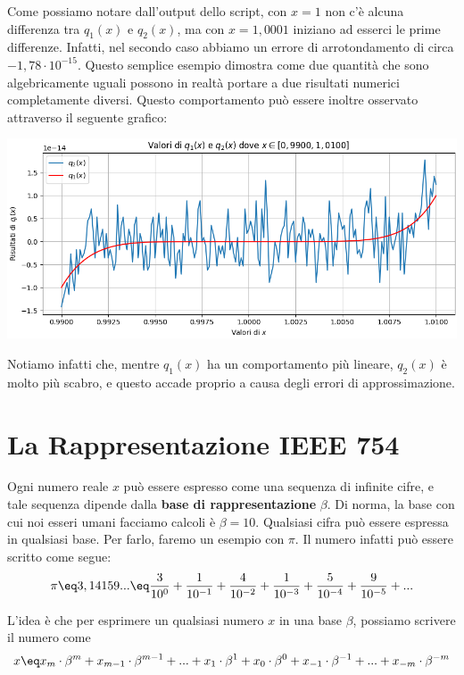 \begin{example}
    Come possiamo notare dall'output dello script, con $x = 1$ non c'è alcuna differenza tra $q_1(x)$ e $q_2(x)$, ma con $x = 1,0001$ iniziano ad esserci le prime differenze. Infatti, nel secondo caso abbiamo un errore di arrotondamento di circa $-1,78 \cdot 10^{-15}$. Questo semplice esempio dimostra come due quantità che sono algebricamente uguali possono in realtà portare a due risultati numerici completamente diversi.
    \nl
    Questo comportamento può essere inoltre osservato attraverso il seguente grafico:
    \begin{center}
        \includegraphics[width = \linewidth]{assets/image-001.png}
    \end{center}

    Notiamo infatti che, mentre $q_1(x)$ ha un comportamento più lineare, $q_2(x)$ è molto più scabro, e questo accade proprio a causa degli errori di approssimazione.
\end{example}

\section{La Rappresentazione IEEE 754}

Ogni numero reale $x$ può essere espresso come una sequenza di infinite cifre, e tale sequenza dipende dalla \textbf{base di rappresentazione} $\beta$. Di norma, la base con cui noi esseri umani facciamo calcoli è $\beta = 10$.
\nl
Qualsiasi cifra può essere espressa in qualsiasi base. Per farlo, faremo un esempio con $\pi$. Il numero infatti può essere scritto come segue:
\[ \pi \eq 3,14159... \eq \frac{3}{10^0} + \frac{1}{10^{-1}} + \frac{4}{10^{-2}} + \frac{1}{10^{-3}} + \frac{5}{10^{-4}} + \frac{9}{10^{-5}} + ... \]

L'idea è che per esprimere un qualsiasi numero $x$ in una base $\beta$, possiamo scrivere il numero come
\[ x \eq x_m \cdot \beta^m + x_{m-1} \cdot \beta^{m-1} + ... + x_{1} \cdot \beta^{1} + x_{0} \cdot \beta^{0} + x_{-1} \cdot \beta^{-1} + ... + x_{-m} \cdot \beta^{-m} \]


